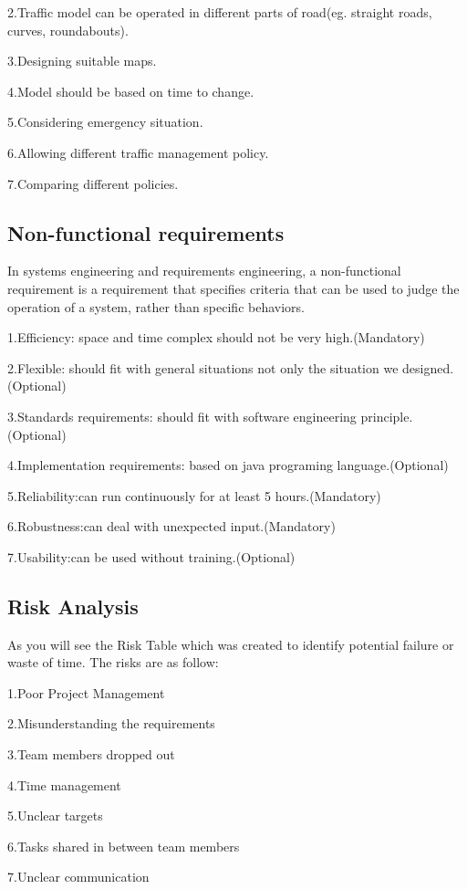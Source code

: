 \documentclass[12pt]{amsart}
\begin{document}
2.Traffic model can be operated in different parts of road(eg. straight roads, curves, roundabouts).

3.Designing suitable maps.

4.Model should be based on time to change.

5.Considering emergency situation.

6.Allowing different traffic management policy.

7.Comparing different policies.


\subsection{Non-functional requirements}
In systems engineering and requirements engineering, a non-functional requirement is a requirement that specifies criteria that can be used to judge the operation of a system, rather than specific behaviors. 

1.Efficiency: space and time complex should not be very high.(Mandatory) 

2.Flexible: should fit with general situations not only the situation we designed.(Optional)

3.Standards requirements: should fit with software engineering principle.(Optional) 

4.Implementation requirements: based on java programing language.(Optional) 

5.Reliability:can run continuously for at least 5 hours.(Mandatory) 

6.Robustness:can deal with unexpected input.(Mandatory) 

7.Usability:can be used without training.(Optional) 

\subsection{Risk Analysis}

As you will see the Risk Table which was created to identify potential failure or waste of time. The risks are as follow:

1.Poor Project Management

2.Misunderstanding the requirements

3.Team members dropped out

4.Time management

5.Unclear targets

6.Tasks shared in between team members

7.Unclear communication
\end{document}

